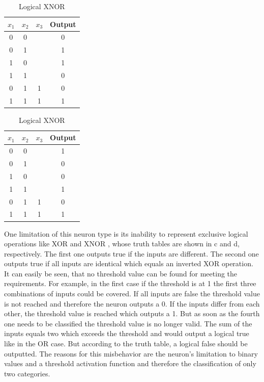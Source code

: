 \begin{table}[]
	\begin{subtable}{.5\textwidth}
		\centering
		\caption{Logical XOR}
		\label{tab:logical-xor}
		\begin{tabular}{ccc|c}
			\hline
			$x_1$ & $x_2$ & $x_3$ & Output 				\\ \hline
			0           & 0           &        & 0      \\
			0           & 1           &        & 1      \\
			1           & 0           &        & 1      \\
			1           & 1           &        & 0      \\ \hline
			0           & 1           & 1      & 0      \\
			1           & 1           & 1      & 1     
		\end{tabular}
	\end{subtable}%
	\begin{subtable}{.5\textwidth}
		\centering
		\caption{Logical XNOR}
		\label{tab:logical-xnor}
		\begin{tabular}{ccc|c}
			\hline
			$x_1$ & $x_2$ & $x_3$ & Output \\ \hline
			0           & 0           &             & 1      \\
			0           & 1           &             & 0      \\
			1           & 0           &             & 0      \\
			1           & 1           &             & 1      \\ \hline
			0           & 1           & 1           & 0      \\
			1           & 1           & 1           & 1     
		\end{tabular}
	\end{subtable}
\end{table}
One limitation of this neuron type is its inability to represent exclusive logical operations like XOR and XNOR \cite{Minsky69}, whose truth tables are shown in c and d, respectively.
The first one outputs true if the inputs are different.
The second one outputs true if all inputs are identical which equals an inverted XOR operation.
It can easily be seen, that no threshold value can be found for meeting the requirements.
For example, in the first case if the threshold is at 1 the first three combinations of inputs could be covered.
If all inputs are false the threshold value is not reached and therefore the neuron outputs a 0.
If the inputs differ from each other, the threshold value is reached which outputs a 1.
But as soon as the fourth one needs to be classified the threshold value is no longer valid.
The sum of the inputs equals two which exceeds the threshold and would output a logical true like in the OR case.
But according to the truth table, a logical false should be outputted.
The reasons for this misbehavior are the neuron's limitation to binary values and a threshold activation function and therefore the classification of only two categories.

